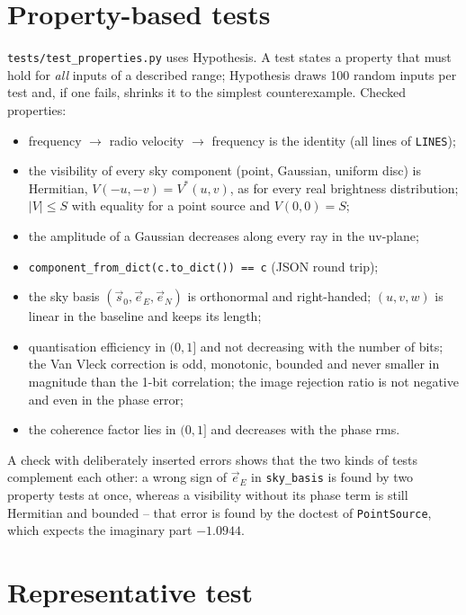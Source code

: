 \section{Property-based tests}\label{sec:hypothesis}

\texttt{tests/test\_properties.py} uses Hypothesis. A test states a
property that must hold for \emph{all} inputs of a described range;
Hypothesis draws 100 random inputs per test and, if one fails, shrinks it
to the simplest counterexample. Checked properties:
\begin{itemize}
  \item frequency $\rightarrow$ radio velocity $\rightarrow$ frequency is
        the identity (all lines of \texttt{LINES});
  \item the visibility of every sky component (point, Gaussian, uniform
        disc) is Hermitian, $V(-u,-v) = V^*(u,v)$, as for every real
        brightness distribution; $|V| \le S$ with equality for a point
        source and $V(0,0) = S$;
  \item the amplitude of a Gaussian decreases along every ray in the
        uv-plane;
  \item \texttt{component\_from\_dict(c.to\_dict()) == c} (JSON round
        trip);
  \item the sky basis $(\vec s_0, \vec e_E, \vec e_N)$ is orthonormal
        and right-handed; $(u,v,w)$ is linear in the baseline and keeps
        its length;
  \item quantisation efficiency in $(0,1]$ and not decreasing with the
        number of bits; the Van Vleck correction is odd, monotonic,
        bounded and never smaller in magnitude than the 1-bit
        correlation; the image rejection ratio is not negative and even
        in the phase error;
  \item the coherence factor lies in $(0,1]$ and decreases with the
        phase rms.
\end{itemize}
A check with deliberately inserted errors shows that the two kinds of
tests complement each other: a wrong sign of $\vec e_E$ in
\texttt{sky\_basis} is found by two property tests at once, whereas a
visibility without its phase term is still Hermitian and bounded -- that
error is found by the doctest of \texttt{PointSource}, which expects the
imaginary part $-1.0944$.

\section{Representative test}\label{sec:representative-test}

